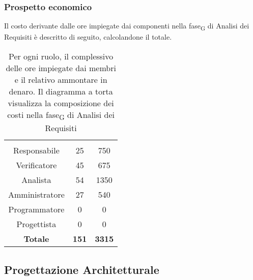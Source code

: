 \subsubsection{Prospetto economico}
Il costo derivante dalle ore impiegate dai componenti nella \gls{fase}\textsubscript{G} di Analisi dei Requisiti è descritto di seguito, calcolandone il totale.

\begin{table}[H]
	{\setlength{\parindent}{0cm}
		\begin{minipage}{.43\textwidth}
			\begin{tabular}{ccc}
				\rowcolorhead
				\headertitle{Ruolo} & \headertitle{Ore} & \headertitle{Costo(\euro{})}\\
				Responsabile & 25 & 750\\
				Verificatore & 45 & 675\\
				Analista & 54 & 1350\\
				Amministratore & 27 & 540\\
				Programmatore & 0 & 0\\
				Progettista & 0 & 0\\
				\hline
				\textbf{Totale} & \textbf{151} & \textbf{3315}\\
			\end{tabular}
		\end{minipage}%
		\begin{minipage}{.57\textwidth}
	\end{minipage} }
	\caption[Prospetto economico della \gls{fase}\textsubscript{G} di Analisi dei Requisiti]{Per ogni ruolo, il complessivo delle ore impiegate dai membri e il relativo ammontare in denaro. Il diagramma a torta visualizza la composizione dei costi nella \gls{fase}\textsubscript{G} di Analisi dei Requisiti}
\end{table}




\subsection{Progettazione Architetturale}

